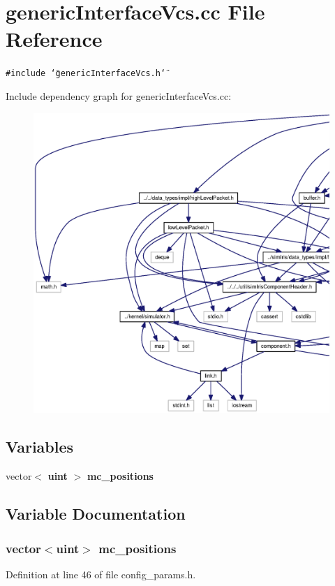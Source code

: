 \section{genericInterfaceVcs.cc File Reference}
\label{genericInterfaceVcs_8cc}
{\tt \#include \char`\"{}genericInterfaceVcs.h\char`\"{}}\par


Include dependency graph for genericInterfaceVcs.cc:\nopagebreak
\begin{figure}[H]
\begin{center}
\leavevmode
\includegraphics[width=420pt]{genericInterfaceVcs_8cc__incl}
\end{center}
\end{figure}
\subsection*{Variables}
\begin{CompactItemize}
\item 
vector$<$ {\bf uint} $>$ {\bf mc\_\-positions}
\end{CompactItemize}


\subsection{Variable Documentation}
\subsubsection[{mc\_\-positions}]{\setlength{\rightskip}{0pt plus 5cm}vector$<${\bf uint}$>$ {\bf mc\_\-positions}}\label{genericInterfaceVcs_8cc_f58ebe62f79b2e470f0cb7da0f7a7ea5}




Definition at line 46 of file config\_\-params.h.